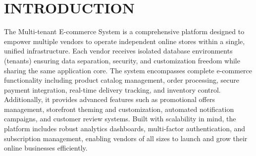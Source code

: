 \chapter{INTRODUCTION}\label{obj}

The Multi-tenant E-commerce System is a comprehensive platform designed to empower multiple vendors to operate independent online stores within a single, unified infrastructure. Each vendor receives isolated database environments (tenants) ensuring data separation, security, and customization freedom while sharing the same application core. The system encompasses complete e-commerce functionality including product catalog management, order processing, secure payment integration, real-time delivery tracking, and inventory control. Additionally, it provides advanced features such as promotional offers management, storefront theming and customization, automated notification campaigns, and customer review systems. Built with scalability in mind, the platform includes robust analytics dashboards, multi-factor authentication, and subscription management, enabling vendors of all sizes to launch and grow their online businesses efficiently.
















